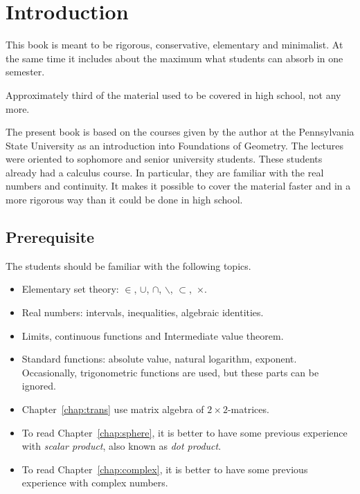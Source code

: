 \chapter*{Introduction}

This book is meant to be 
rigorous, 
conservative, 
elementary and
minimalist.
At the same time it includes about the maximum what students can absorb in one semester.

Approximately third of the material used to be covered in high school, not any more.

The present book is based 
on the courses given by the author 
at the Pennsylvania State University
as an introduction into Foundations of Geometry.
The lectures were oriented to sophomore and senior university students.  
These students already had a calculus course.
In particular, they are familiar with the real numbers and continuity.
It makes it possible to cover the material faster 
and  in a more rigorous way
than it could be done in high school.

\section*{Prerequisite}

The students should be familiar 
with the following topics.
\begin{itemize}
\item Elementary set theory: 
$\in$,
$\cup$, 
$\cap$,
$\backslash$,
$\subset$,~$\times$.
\item Real numbers: intervals, inequalities, algebraic identities.
\item Limits, continuous functions and  Intermediate value theorem.
\item Standard functions: 
absolute value, 
natural logarithm,
exponent. 
Occasionally, trigonometric functions  are used, 
but these parts can be ignored.
\item  Chapter~\ref{chap:trans} 
use matrix algebra of $2{\times}2$-matrices.
\item To read Chapter~\ref{chap:sphere}, it is better to have some previous experience with {}\emph{scalar product}, also known as {}\emph{dot product}.
\item To read Chapter~\ref{chap:complex}, it is better to have some previous experience with complex numbers.
\end{itemize} 

